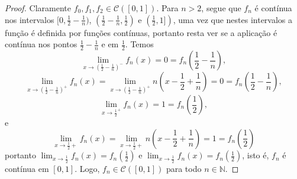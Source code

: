 \begin{proof}
    Claramente \(f_0, f_1, f_2 \in \mathcal{C}([0,1])\). Para \(n > 2\), segue que \(f_n\) é contínua nos intervalos \([0,\frac12 - \frac1n)\), \((\frac12-\frac1n, \frac12)\) e \((\frac12, 1])\), uma vez que nestes intervalos a função é definida por funções contínuas, portanto resta ver se a aplicação é contínua nos pontos \(\frac12-\frac1n\) e em \(\frac12\). Temos
    \begin{equation*}
        \lim_{x\to \left(\frac12-\frac1n\right)^-} f_n(x) = 0 = f_n\left(\frac12-\frac1n\right),
    \end{equation*}
    \begin{equation*}
        \lim_{x\to \left(\frac12-\frac1n\right)^+} f_n(x) = \lim_{x\to\left(\frac12-\frac1n\right)^+} n\left(x-\frac12+\frac1n\right) = 0 = f_n\left(\frac12-\frac1n\right),
    \end{equation*}
    \begin{equation*}
        \lim_{x\to \frac12^+} f_n(x) = 1 = f_n\left(\frac12\right),
    \end{equation*}
    e
    \begin{equation*}
        \lim_{x\to \frac12+} f_n(x) = \lim_{x\to\frac12+} n\left(x-\frac12+\frac1n\right) = 1 = f_n\left(\frac12\right)
    \end{equation*}
    portanto \(\lim_{x\to\frac12} f_n(x) = f_n\left(\frac12\right)\) e \(\lim_{x\to\frac12} f_n(x) = f_n\left(\frac12\right)\), isto é, \(f_n\) é contínua em \([0,1]\). Logo, \(f_n \in \mathcal{C}([0,1])\) para todo \(n \in \mathbb{N}\).


\end{proof}
